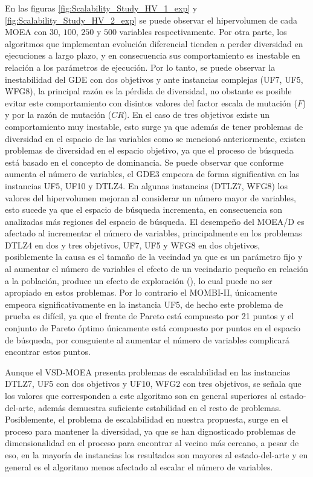 En las figuras \ref{fig:Scalability_Study_HV_1_exp} y \ref{fig:Scalability_Study_HV_2_exp} se puede observar el hipervolumen de cada MOEA con $30$, $100$, $250$ y $500$ variables respectivamente.
%
Por otra parte, los algoritmos que implementan evolución diferencial tienden a perder diversidad en ejecuciones a largo plazo, y en consecuencia sus comportamiento es inestable en relación a los parámetros de ejecución.
%
Por lo tanto, se puede observar la inestabilidad del GDE con dos objetivos y ante instancias complejas (UF7, UF5, WFG8), la principal razón es la pérdida de diversidad, no obstante es posible evitar este comportamiento con disintos valores del factor escala de mutación ($F$) y por la razón de mutación ($CR$).
%
En el caso de tres objetivos existe un comportamiento muy inestable, esto surge ya que además de tener problemas de diversidad en el espacio de las variables como se mencionó anteriormente, existen problemas de diversidad en el espacio objetivo, ya que el proceso de búsqueda está basado en el concepto de dominancia.
%
Se puede observar que conforme aumenta el número de variables, el GDE3 empeora de forma significativa en las instancias UF5, UF10 y DTLZ4.
%
En algunas instancias (DTLZ7, WFG8) los valores del hipervolumen mejoran al considerar un número mayor de variables, esto sucede ya que el espacio de búsqueda incrementa, en consecuencia son analizadas más regiones del espacio de búsqueda.
El desempeño del MOEA/D es afectado al incrementar el número de variables, principalmente en los problemas DTLZ4 en dos y tres objetivos, UF7, UF5 y WFG8 en dos objetivos, posiblemente la causa es el tamaño de la vecindad ya que es un parámetro fijo y al aumentar el número de variables el efecto de un vecindario pequeño en relación a la población, produce un efecto de exploración (\cite{Joel:MOEAD_AWA}), lo cual puede no ser apropiado en estos problemas.
%
Por lo contrario el MOMBI-II, únicamente empeora significativamente en la instancia UF5, de hecho este problema de prueba es difícil, ya que el frente de Pareto está compuesto por 21 puntos y el conjunto de Pareto óptimo únicamente está compuesto por puntos en el espacio de búsqueda, por consguiente al aumentar el número de variables complicará encontrar estos puntos.
%


Aunque el VSD-MOEA presenta problemas de escalabilidad en las instancias DTLZ7, UF5 con dos objetivos y UF10, WFG2 con tres objetivos, se señala que los valores que corresponden a este algoritmo son en general superiores al estado-del-arte, además demuestra suficiente estabilidad en el resto de problemas.
%
Posiblemente, el problema de escalabilidad en nuestra propuesta, surge en el proceso para mantener la diversidad, ya que se han dignosticado problemas de dimensionalidad en el proceso para encontrar al vecino más cercano, a pesar de eso, en la mayoría de instancias los resultados son mayores al estado-del-arte y en general es el algoritmo menos afectado al escalar el número de variables.

